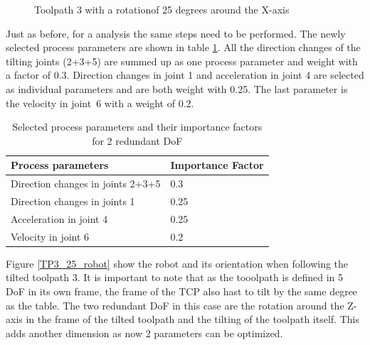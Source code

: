 \begin{figure}[H]
\begin{minipage}{0.5\textwidth}
		\caption{Toolpath 3 with a rotation\newline of 25 degrees around the X-axis}
		\label{TP3_25}
	\end{minipage}\par
\end{figure}
 

Just as before, for a analysis the same steps need to be performed. The newly selected process parameters are shown in table \ref{PP_2}. All the direction changes of the tilting joints (2+3+5) are summed up as one process parameter and weight with a factor of 0.3. Direction changes in joint 1 and acceleration in joint 4 are selected as individual parameters and are both weight with 0.25. The last parameter is the velocity in joint~6 with a weight of 0.2.  
\begin{table}[H]
	\centering
	\begin{tabular}{||l|l||}
		Process parameters& Importance Factor \\
		\hline
		\hline
		\hline
		Direction changes in joints 2+3+5	&		0.3 \\
		Direction changes in joints 1	&  	0.25 \\
		Acceleration in joint 4	& 		0.25\\
		Velocity in joint 6	& 		0.2\\
		\hline
		\hline
	\end{tabular}
	
	\caption{Selected process parameters and their importance factors for 2 redundant DoF}
	\label{PP_2}
\end{table}



\newpage
Figure \ref{TP3_25_robot} show the robot and its orientation when following the tilted toolpath 3. It is important to note that as the tooolpath is defined in 5 DoF in its own frame, the frame of the TCP also hast to tilt by the same degree as the table. The two redundant DoF in this case are the rotation around the Z-axis in the frame of the tilted toolpath and the tilting of the toolpath itself. This adds another dimension as now 2 parameters can be optimized.


